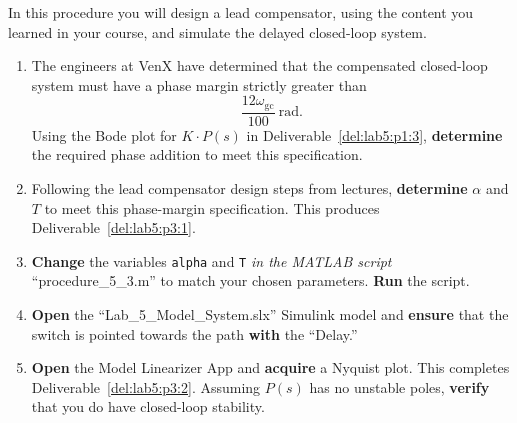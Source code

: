 \begin{procedure}[label={proc:lab5:3}]
  In this procedure you will design a lead compensator, using the content you learned in your course, and simulate the delayed closed-loop system.
  \begin{enumerate}[label={(\arabic*)}]
    \item{%
      The engineers at VenX have determined that the compensated closed-loop system must have a phase margin strictly greater than
      \[
        \frac{12\omega_\mathrm{gc}}{100}~\mathrm{rad}.
      \]
      Using the Bode plot for \(K \cdot P(s)\) in Deliverable~\ref{del:lab5:p1:3}, \textbf{determine} the required phase addition to meet this specification.
    }
    \item{%
      Following the lead compensator design steps from lectures, \textbf{determine} \(\alpha\) and \(T\) to meet this phase-margin specification.
      This produces Deliverable~\ref{del:lab5:p3:1}.
    }
    \item{%
      \textbf{Change} the variables \texttt{alpha} and \texttt{T} \emph{in the MATLAB script} ``procedure\_5\_3.m'' to match your chosen parameters.
      \textbf{Run} the script.
    }
    \item{%
      \textbf{Open} the ``Lab\_5\_Model\_System.slx'' Simulink model and \textbf{ensure} that the switch is pointed towards the path \textbf{with} the ``Delay.''
    }
    \item{%
      \textbf{Open} the Model Linearizer App and \textbf{acquire} a Nyquist plot.
      This completes Deliverable~\ref{del:lab5:p3:2}.
      Assuming \(P(s)\) has no unstable poles, \textbf{verify} that you do  have closed-loop stability.
    }
  \end{enumerate}
\end{procedure}

